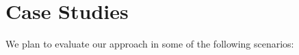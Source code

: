 \documentclass[11pt]{article}
\newcommand{\Fix}[1]{\textbf{[[}{\color{red} #1}\textbf{]]}}
\begin{document}


\section{Case Studies}


We plan to evaluate our approach in some of the following scenarios:
\end{document}
